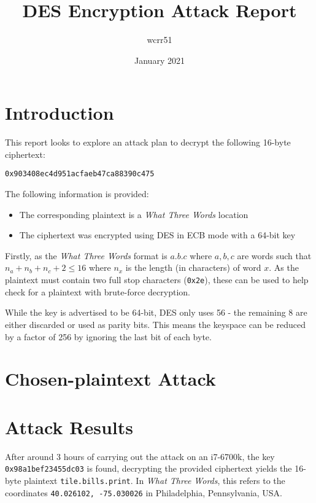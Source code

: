 \documentclass[11pt]{article}
\title{DES Encryption Attack Report}
\author{wcrr51}
\date{January 2021}
\begin{document}
    \maketitle

    \begin{multicols*}{2}
        \section{Introduction}\label{sec:introduction}
        This report looks to explore an attack plan to decrypt the following 16-byte ciphertext:
        \begin{center}
            \texttt{0x903408ec4d951acfaeb47ca88390c475}
        \end{center}
        The following information is provided:
        \begin{itemize}
            \item The corresponding plaintext is a \textit{What Three Words} location
            \item The ciphertext was encrypted using DES in ECB mode with a 64-bit key
        \end{itemize}

        Firstly, as the \textit{What Three Words} format is $a.b.c$ where $a, b, c$ are words such that $n_a + n_b + n_c + 2 \leq 16$ where $n_x$ is the length (in characters) of word $x$.
        As the plaintext must contain two full stop characters (\texttt{0x2e}), these can be used to help check for a plaintext with brute-force decryption.

        While the key is advertised to be 64-bit, DES only uses 56 - the remaining 8 are either discarded or used as parity bits.
        This means the keyspace can be reduced by a factor of 256 by ignoring the last bit of each byte.


        \section{Chosen-plaintext Attack}\label{sec:chosen-plaintext-attack}


        \section{Attack Results}\label{sec:attack-results}
        After around 3 hours of carrying out the attack on an i7-6700k, the key \texttt{0x98a1bef23455dc03} is found, decrypting the provided ciphertext yields the 16-byte plaintext \texttt{tile.bills.print}.
        In \textit{What Three Words}, this refers to the coordinates \texttt{40.026102, -75.030026} in Philadelphia, Pennsylvania, USA\@.
    \end{multicols*}
\end{document}
